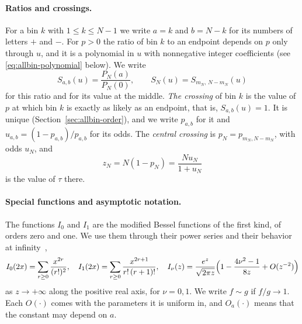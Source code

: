\documentclass[11pt]{article}
\theoremstyle{definition}
\theoremstyle{remark}
\newcommand{\sR}{\mathord{+}}
\newcommand{\sL}{\mathord{-}}
\begin{document}
\paragraph{Ratios and crossings.} For a bin $k$ with $1\le k\le N-1$ we write
$a=k$ and $b=N-k$ for its numbers of letters $\sR$ and $\sL$. For $p>0$ the
ratio of bin $k$ to an endpoint depends on $p$ only through $u$, and it is a
polynomial in $u$ with nonnegative integer coefficients
(see \eqref{eq:allbin-polynomial} below). We write
\[
S_{a,b}(u)=\frac{P_N(a)}{P_N(0)},\qquad S_N(u)=S_{m_N,\,N-m_N}(u)
\]
for this ratio and for its value at the middle. \emph{The crossing} of bin $k$
is the value of $p$ at which bin $k$ is exactly as likely as an endpoint, that
is, $S_{a,b}(u)=1$. It is unique (Section~\ref{sec:allbin-order}), and we write
$p_{a,b}$ for it and $u_{a,b}=(1-p_{a,b})/p_{a,b}$ for its odds. The
\emph{central crossing} is $p_N=p_{m_N,N-m_N}$, with odds $u_N$, and
\begin{equation}\label{eq:zN}
z_N=N(1-p_N)=\frac{Nu_N}{1+u_N}
\end{equation}
is the value of $\tau$ there.

\paragraph{Special functions and asymptotic notation.} The functions $I_0$ and
$I_1$ are the modified Bessel functions of the first kind, of orders zero and
one. We use them through their power
series and their behavior at infinity~\cite[Eqs.~10.25.2, 10.40.1]{dlmf},
\[
I_0(2x)=\sum_{r\ge0}\frac{x^{2r}}{(r!)^2},\quad
I_1(2x)=\sum_{r\ge0}\frac{x^{2r+1}}{r!\,(r+1)!},\quad
I_\nu(z)=\frac{e^z}{\sqrt{2\pi z}}\Bigl(1-\frac{4\nu^2-1}{8z}+O(z^{-2})\Bigr)
\]
as $z\to+\infty$ along the positive real axis, for $\nu=0,1$.
We write $f\sim g$ if $f/g\to1$. Each $O(\cdot)$ comes with the parameters it
is uniform in, and $O_a(\cdot)$ means that the constant may depend on $a$.
\end{document}
